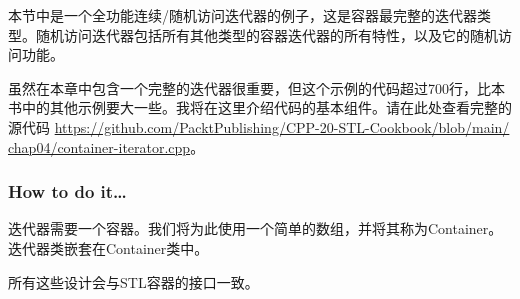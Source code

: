 
本节中是一个全功能连续/随机访问迭代器的例子，这是容器最完整的迭代器类型。随机访问迭代器包括所有其他类型的容器迭代器的所有特性，以及它的随机访问功能。

虽然在本章中包含一个完整的迭代器很重要，但这个示例的代码超过700行，比本书中的其他示例要大一些。我将在这里介绍代码的基本组件。请在此处查看完整的源代码 \url{https://github.com/PacktPublishing/CPP-20-STL-Cookbook/blob/main/ chap04/container-iterator.cpp}。


\subsubsection{How to do it…}

迭代器需要一个容器。我们将为此使用一个简单的数组，并将其称为Container。迭代器类嵌套在Container类中。

所有这些设计会与STL容器的接口一致。

